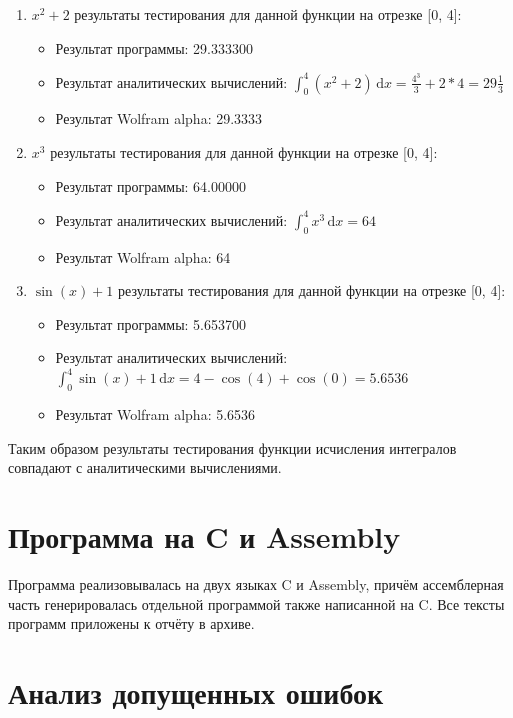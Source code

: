 \documentclass[a4paper,12pt,titlepage,finall]{article}
\begin{document}
\begin{enumerate}
  \item {$x^2+2$} результаты тестирования для данной функции на отрезке [0, 4]:
  \begin{itemize}
    \item Результат программы: 29.333300
    \item Результат аналитических вычислений: {$\int_0^4 \!(x^2+2)\, \mathrm{d}x=\frac{4^3}{3}+2*4=29\frac{1}{3}$}
    \item Результат Wolfram alpha: 29.3333
  \end{itemize}
  \item {$x^3$} результаты тестирования для данной функции на отрезке [0, 4]:
  \begin{itemize}
    \item Результат программы: 64.00000
    \item Результат аналитических вычислений: {$\int_0^4\!x^3\,\mathrm{d}x=64$}
    \item Результат Wolfram alpha: 64
  \end{itemize}
\item {$\sin(x)+1$} результаты тестирования для данной функции на отрезке [0, 4]:
  \begin{itemize}
    \item Результат программы: 5.653700
    \item Результат аналитических вычислений: {$\int_0^4\!\sin(x)+1\,\mathrm{d}x=4-\cos(4)+\cos(0)=5.6536$}
    \item Результат Wolfram alpha: 5.6536
  \end{itemize}
\end{enumerate}

Таким образом результаты тестирования функции исчисления интегралов совпадают с аналитическими вычислениями.

\newpage

\section{Программа на C и Assembly}

Программа реализовывалась на двух языках C и Assembly, причём ассемблерная часть генерировалась отдельной программой также написанной на C. Все тексты программ приложены к отчёту в архиве. 
\newpage

\section{Анализ допущенных ошибок}
\end{document}
